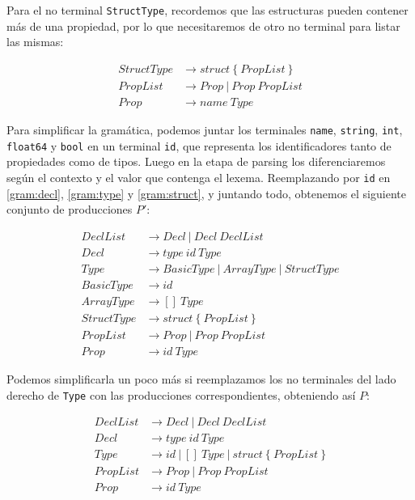 Para el no terminal \texttt{StructType}, recordemos que las estructuras pueden contener más de una propiedad, por lo que necesitaremos de otro no terminal para listar las mismas:

\begin{equation} \label{gram:struct}
\begin{split}
StructType & \rightarrow struct~\{~PropList~\} \\
PropList & \rightarrow Prop~|~Prop~PropList \\
Prop & \rightarrow name~Type
\end{split}
\end{equation}

Para simplificar la gramática, podemos juntar los terminales \texttt{name}, \texttt{string}, \texttt{int}, \texttt{float64} y \texttt{bool} en un terminal \texttt{id}, que representa los identificadores tanto de propiedades como de tipos. Luego en la etapa de parsing los diferenciaremos según el contexto y el valor que contenga el lexema. Reemplazando por \texttt{id} en \ref{gram:decl}, \ref{gram:type} y \ref{gram:struct}, y juntando todo, obtenemos el siguiente conjunto de producciones $P'$:


\begin{equation}
\begin{split}
DeclList & \rightarrow Decl~|~Decl~DeclList  \\
Decl & \rightarrow type~id~Type \\
Type & \rightarrow BasicType~|~ArrayType~|~StructType \\
BasicType & \rightarrow id \\
ArrayType & \rightarrow []~Type \\
StructType & \rightarrow struct~\{~PropList~\} \\
PropList & \rightarrow Prop~|~Prop~PropList \\
Prop & \rightarrow id~Type
\end{split}
\end{equation}

Podemos simplificarla un poco más si reemplazamos los no terminales del lado derecho de \texttt{Type} con las producciones correspondientes, obteniendo así $P$:

\begin{equation}
\begin{split}
DeclList & \rightarrow Decl~|~Decl~DeclList  \\
Decl & \rightarrow type~id~Type \\
Type & \rightarrow id~|~[]~Type~|~struct~\{~PropList~\} \\
PropList & \rightarrow Prop~|~Prop~PropList \\
Prop & \rightarrow id~Type
\end{split}
\end{equation}


